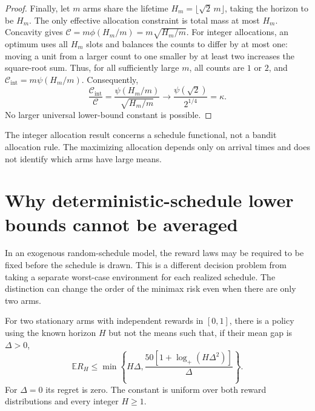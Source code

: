 \begin{proof}
Finally, let $m$ arms share the lifetime
$H_m=\lfloor\sqrt2\,m\rfloor$, taking the horizon to be $H_m$.
The only effective allocation constraint is total mass at most $H_m$.
Concavity gives
$\mathscr C=m\phi(H_m/m)=m\sqrt{H_m/m}$.
For integer allocations, an optimum uses all $H_m$ slots and balances
the counts to differ by at most one: moving a unit from a larger count
to one smaller by at least two increases the square-root sum. Thus,
for all sufficiently large $m$, all counts are $1$ or $2$, and
$\mathscr C_{\mathrm{int}}=m\psi(H_m/m)$. Consequently,
\[
 \frac{\mathscr C_{\mathrm{int}}}{\mathscr C}
 =\frac{\psi(H_m/m)}{\sqrt{H_m/m}}
 \longrightarrow
 \frac{\psi(\sqrt2)}{2^{1/4}}=\kappa.
\]
No larger universal lower-bound constant is possible.
\end{proof}

The integer allocation result concerns a schedule functional, not a
bandit allocation rule. The maximizing allocation depends only on
arrival times and does not identify which arms have large means.

\section{Why deterministic-schedule lower bounds cannot be averaged}
\label{sec:random-schedule-separation}

In an exogenous random-schedule model, the reward laws may be required
to be fixed before the schedule is drawn. This is a different decision
problem from taking a separate worst-case environment for each
realized schedule. The distinction can change the order of the minimax
risk even when there are only two arms.

\begin{lemma}
\label{lem:two-arm-local-gap}
For two stationary arms with independent rewards in $[0,1]$, there is
a policy using the known horizon $H$ but not the means such that, if
their mean gap is $\Delta>0$,
\begin{equation}
 \mathbb E R_H\le
 \min\left\{H\Delta,
       \frac{50[1+\log_+(H\Delta^2)]}{\Delta}\right\}.
 \label{eq:two-arm-local-gap}
\end{equation}
For $\Delta=0$ its regret is zero. The constant is uniform over both
reward distributions and every integer $H\ge1$.
\end{lemma}

